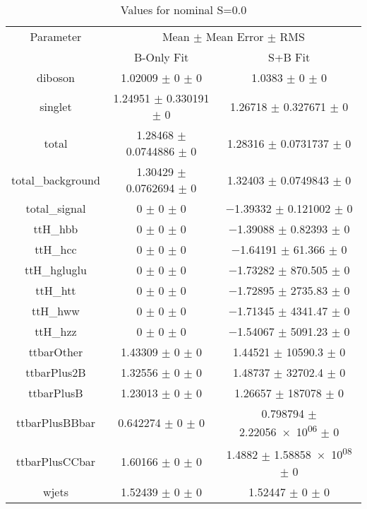 \begin{table}
\centering
\caption{Values for nominal S=0.0}
\begin{tabular}{ccc}
\toprule
Parameter & \multicolumn{2}{c}{Mean $\pm$ Mean Error $\pm$ RMS}\\
 & B-Only Fit & S+B Fit\\
\midrule
diboson & \num{1.02009} $\pm$ \num{0} $\pm$ \num{0} & \num{1.0383} $\pm$ \num{0} $\pm$ \num{0}\\
singlet & \num{1.24951} $\pm$ \num{0.330191} $\pm$ \num{0} & \num{1.26718} $\pm$ \num{0.327671} $\pm$ \num{0}\\
total & \num{1.28468} $\pm$ \num{0.0744886} $\pm$ \num{0} & \num{1.28316} $\pm$ \num{0.0731737} $\pm$ \num{0}\\
total\_background & \num{1.30429} $\pm$ \num{0.0762694} $\pm$ \num{0} & \num{1.32403} $\pm$ \num{0.0749843} $\pm$ \num{0}\\
total\_signal & \num{0} $\pm$ \num{0} $\pm$ \num{0} & \num{-1.39332} $\pm$ \num{0.121002} $\pm$ \num{0}\\
ttH\_hbb & \num{0} $\pm$ \num{0} $\pm$ \num{0} & \num{-1.39088} $\pm$ \num{0.82393} $\pm$ \num{0}\\
ttH\_hcc & \num{0} $\pm$ \num{0} $\pm$ \num{0} & \num{-1.64191} $\pm$ \num{61.366} $\pm$ \num{0}\\
ttH\_hgluglu & \num{0} $\pm$ \num{0} $\pm$ \num{0} & \num{-1.73282} $\pm$ \num{870.505} $\pm$ \num{0}\\
ttH\_htt & \num{0} $\pm$ \num{0} $\pm$ \num{0} & \num{-1.72895} $\pm$ \num{2735.83} $\pm$ \num{0}\\
ttH\_hww & \num{0} $\pm$ \num{0} $\pm$ \num{0} & \num{-1.71345} $\pm$ \num{4341.47} $\pm$ \num{0}\\
ttH\_hzz & \num{0} $\pm$ \num{0} $\pm$ \num{0} & \num{-1.54067} $\pm$ \num{5091.23} $\pm$ \num{0}\\
ttbarOther & \num{1.43309} $\pm$ \num{0} $\pm$ \num{0} & \num{1.44521} $\pm$ \num{10590.3} $\pm$ \num{0}\\
ttbarPlus2B & \num{1.32556} $\pm$ \num{0} $\pm$ \num{0} & \num{1.48737} $\pm$ \num{32702.4} $\pm$ \num{0}\\
ttbarPlusB & \num{1.23013} $\pm$ \num{0} $\pm$ \num{0} & \num{1.26657} $\pm$ \num{187078} $\pm$ \num{0}\\
ttbarPlusBBbar & \num{0.642274} $\pm$ \num{0} $\pm$ \num{0} & \num{0.798794} $\pm$ \num{2.22056e+06} $\pm$ \num{0}\\
ttbarPlusCCbar & \num{1.60166} $\pm$ \num{0} $\pm$ \num{0} & \num{1.4882} $\pm$ \num{1.58858e+08} $\pm$ \num{0}\\
wjets & \num{1.52439} $\pm$ \num{0} $\pm$ \num{0} & \num{1.52447} $\pm$ \num{0} $\pm$ \num{0}\\
\bottomrule
\end{tabular}
\end{table}